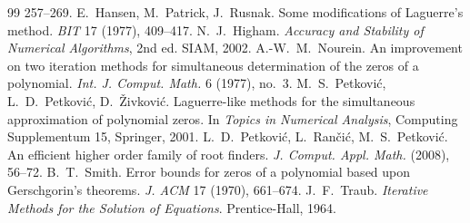 \documentclass[10pt,a4paper]{article}
\theoremstyle{definition}
\numberwithin{equation}{section}
\begin{document}
\begin{thebibliography}{99}
 257--269.
 E.~Hansen, M.~Patrick, J.~Rusnak. Some modifications of Laguerre's method. \emph{BIT} 17
 (1977), 409--417.
 N.~J.~Higham. \emph{Accuracy and Stability of Numerical Algorithms}, 2nd ed. SIAM,
 2002.
 A.-W.~M.~Nourein. An improvement on two iteration methods for simultaneous
 determination of the zeros of a polynomial. \emph{Int. J. Comput. Math.} 6 (1977), no.~3.
 M.~S.~Petkovi\'c, L.~D.~Petkovi\'c, D.~\v{Z}ivkovi\'c. Laguerre-like methods for the
 simultaneous approximation of polynomial zeros. In \emph{Topics in Numerical Analysis}, Computing
 Supplementum 15, Springer, 2001.
 L.~D.~Petkovi\'c, L.~Ran\v{c}i\'c, M.~S.~Petkovi\'c. An efficient higher order family
 of root finders. \emph{J. Comput. Appl. Math.} (2008), 56--72.
 B.~T.~Smith. Error bounds for zeros of a polynomial based upon Gerschgorin's theorems.
 \emph{J. ACM} 17 (1970), 661--674.
 J.~F.~Traub. \emph{Iterative Methods for the Solution of Equations}. Prentice-Hall,
 1964.
\end{thebibliography}
\end{document}
